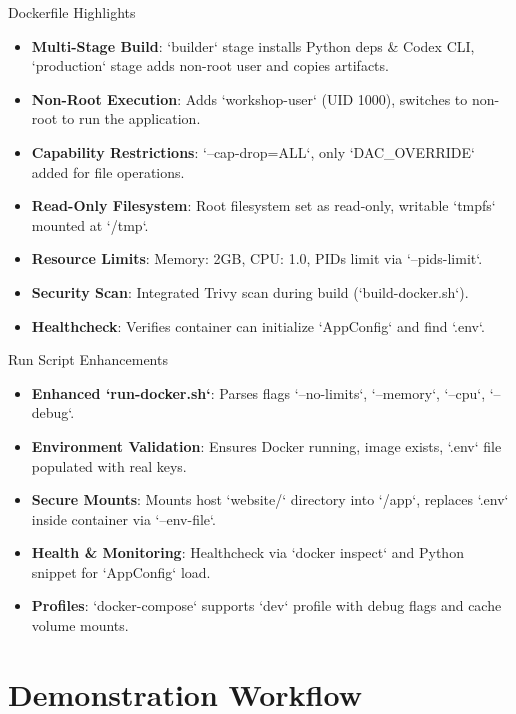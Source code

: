 \documentclass{beamer}
\begin{document}
\begin{frame}{Dockerfile Highlights}
\begin{itemize}
\item \textbf{Multi-Stage Build}: `builder` stage installs Python deps & Codex CLI, `production` stage adds non-root user and copies artifacts.
\item \textbf{Non-Root Execution}: Adds `workshop-user` (UID 1000), switches to non-root to run the application.
\item \textbf{Capability Restrictions}: `--cap-drop=ALL`, only `DAC_OVERRIDE` added for file operations.
\item \textbf{Read-Only Filesystem}: Root filesystem set as read-only, writable `tmpfs` mounted at `/tmp`.
\item \textbf{Resource Limits}: Memory: 2GB, CPU: 1.0, PIDs limit via `--pids-limit`.
\item \textbf{Security Scan}: Integrated Trivy scan during build (`build-docker.sh`).
\item \textbf{Healthcheck}: Verifies container can initialize `AppConfig` and find `.env`.
\end{itemize}
\end{frame}

\begin{frame}{Run Script Enhancements}
\begin{itemize}
\item \textbf{Enhanced `run-docker.sh`}: Parses flags `--no-limits`, `--memory`, `--cpu`, `--debug`.
\item \textbf{Environment Validation}: Ensures Docker running, image exists, `.env` file populated with real keys.
\item \textbf{Secure Mounts}: Mounts host `website/` directory into `/app`, replaces `.env` inside container via `--env-file`.
\item \textbf{Health & Monitoring}: Healthcheck via `docker inspect` and Python snippet for `AppConfig` load.
\item \textbf{Profiles}: `docker-compose` supports `dev` profile with debug flags and cache volume mounts.
\end{itemize}
\end{frame}

\section{Demonstration Workflow}
\end{document}
